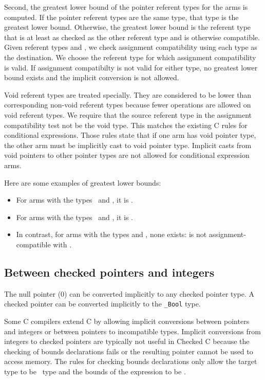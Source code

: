 Second, the greatest lower bound of the pointer referent types for the arms is computed.
If the pointer referent types are the same type, that type is the greatest lower bound.
Otherwise, the greatest lower bound is the referent type that is at least as checked as the
other referent type and is otherwise compatible.  Given referent types  and ,
we check assignment compatibility using each type as the destination.  We
choose the referent type for which assignment compatibility is valid.
If assignment compatibilty is not valid for either type, no greatest lower
bound exists and the implicit conversion is not allowed.

Void referent types are treated specially. They are considered to be lower than
corresponding non-void referent types because fewer operations are allowed on
void referent types. We require that the source referent
type in the assignment compatibility test not be the void type.
This matches the existing C rules for conditional expressions.  Those
rules state that if one arm has void pointer type, the other
arm must be implicitly cast to void pointer type.  Implicit casts from void pointers to other
pointer types are not allowed for conditional expression arms.

Here are some examples of greatest lower bounds:
\begin{itemize}
\item  For arms with the types \arrayptrint\ and \ptrint, it is \ptrint.
\item  For arms with the types \arrayptrvoid\ and ,
it is \arrayptrvoid.
\item In contrast, for arms with the types  and , none exists:
 is not assignment-compatible with .
\end{itemize}

\subsection{Between checked pointers and integers}

The null pointer (0) can be converted implicitly to any checked pointer type.
A checked pointer can be converted implicitly to the \texttt{\_Bool} type.

Some C compilers extend C by allowing implicit conversions between pointers
and integers or between pointers to incompatible types.  Implicit conversions
from integers to checked pointers are typically not useful in Checked C because
the checking of bounds declarations fails or the resulting pointer cannot
be used to access memory.   The rules for checking bounds declarations only
allow the target type to be \arrayptr\ type and the bounds of the expression to be
\boundsunknown.

